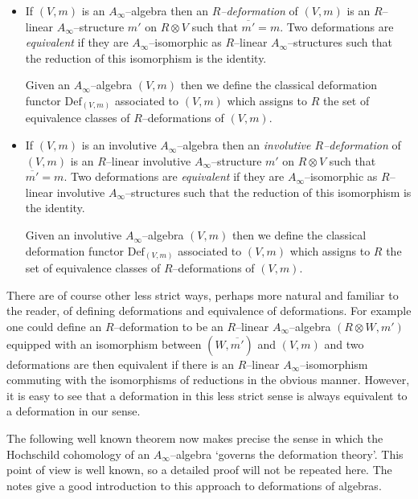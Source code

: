 \documentclass[british]{amsart}
\theoremstyle{plain}
\theoremstyle{definition}
{
\newaliascnt{{definition}}{theorem}\newtheorem{{definition}}[{definition}]{{Definition}}\aliascntresetthe{{definition}}\expandafterautorefname\endcsname{{Definition}}}
{
\newaliascnt{{remark}}{theorem}\newtheorem{{remark}}[{remark}]{{Remark}}\aliascntresetthe{{remark}}\expandafterautorefname\endcsname{{Remark}}}
{
\newaliascnt{{example}}{theorem}\newtheorem{{example}}[{example}]{{Example}}\aliascntresetthe{{example}}\expandafterautorefname\endcsname{{Example}}}
{
\newaliascnt{{examples}}{theorem}\newtheorem{{examples}}[{examples}]{{Examples}}\aliascntresetthe{{examples}}\expandafterautorefname\endcsname{{Examples}}}
{
\newaliascnt{{notation}}{theorem}\newtheorem{{notation}}[{notation}]{{Notation}}\aliascntresetthe{{notation}}\expandafterautorefname\endcsname{{Notation}}}
{
\newaliascnt{{convention}}{theorem}\newtheorem{{convention}}[{convention}]{{Convention}}\aliascntresetthe{{convention}}\expandafterautorefname\endcsname{{Convention}}}
\numberwithin{equation}{section}
\numberwithin{figure}{section}
\begin{document}
\begin{definition}
\mbox{}
\begin{itemize}
\item If $(V,m)$ is an $A_\infty$--algebra then an \emph{$R$--deformation} of $(V,m)$ is an $R$--linear $A_\infty$--structure $m'$ on $R\otimes V$ such that ${\overline{{m'}}}=m$. Two deformations are \emph{equivalent} if they are $A_\infty$--isomorphic as $R$--linear $A_\infty$--structures such that the reduction of this isomorphism is the identity.

Given an $A_\infty$--algebra $(V,m)$ then we define the classical deformation functor ${\mathrm{Def}}_{(V,m)}$ associated to $(V,m)$ which assigns to $R$ the set of equivalence classes of $R$--deformations of $(V,m)$.
\item If $(V,m)$ is an involutive $A_\infty$--algebra then an \emph{involutive $R$--deformation} of $(V,m)$ is an $R$--linear involutive $A_\infty$--structure $m'$ on $R\otimes V$ such that ${\overline{{m'}}}=m$. Two deformations are \emph{equivalent} if they are $A_\infty$--isomorphic as $R$--linear involutive $A_\infty$--structures such that the reduction of this isomorphism is the identity.

Given an involutive $A_\infty$--algebra $(V,m)$ then we define the classical deformation functor ${\mathrm{Def}}_{(V,m)}$ associated to $(V,m)$ which assigns to $R$ the set of equivalence classes of $R$--deformations of $(V,m)$.
\end{itemize}
\end{definition}

\begin{remark}
There are of course other less strict ways, perhaps more natural and familiar to the reader, of defining deformations and equivalence of deformations. For example one could define an $R$--deformation to be an $R$--linear $A_\infty$--algebra $(R\otimes W,m')$ equipped with an isomorphism between $(W,{\overline{{m'}}})$ and $(V,m)$ and two deformations are then equivalent if there is an $R$--linear $A_\infty$--isomorphism commuting with the isomorphisms of reductions in the obvious manner. However, it is easy to see that a deformation in this less strict sense is always equivalent to a deformation in our sense.
\end{remark}

The following well known theorem now makes precise the sense in which the Hochschild cohomology of an $A_\infty$--algebra `governs the deformation theory'. This point of view is well known, so a detailed proof will not be repeated here. The notes \cite{doubekmarklzima2007:deformationtheory} give a good introduction to this approach to deformations of algebras.
\end{document}
